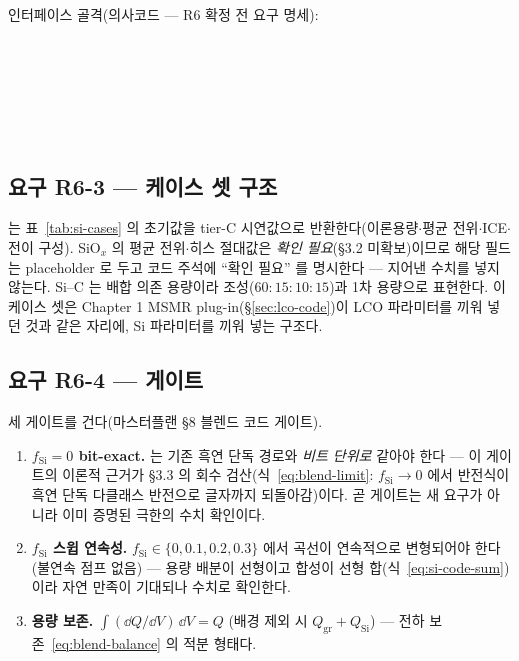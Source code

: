 \begin{codebox}
인터페이스 골격(의사코드 --- R6 확정 전 요구 명세):\\
\\
\\
\\
\\
\\
\\
\end{codebox}

\subsection{요구 R6-3 --- 케이스 셋 구조}\label{ssec:si-code-caseset}
 는 표~\ref{tab:si-cases} 의 초기값을 tier-C 시연값으로 반환한다(이론용량$\cdot$평균
전위$\cdot$ICE$\cdot$전이 구성). SiO$_x$ 의 평균 전위$\cdot$히스 절대값은 \emph{확인 필요}(§3.2 미확보)이므로
해당 필드는 placeholder 로 두고 코드 주석에 ``확인 필요'' 를 명시한다 --- 지어낸 수치를 넣지 않는다.
Si--C 는 배합 의존 용량이라 조성($60{:}15{:}10{:}15$)과 1차 용량으로 표현한다. 이 케이스 셋은 Chapter 1
MSMR plug-in(\S\ref{sec:lco-code})이 LCO 파라미터를 끼워 넣던 것과 같은 자리에, Si 파라미터를 끼워
넣는 구조다.

\subsection{요구 R6-4 --- 게이트}\label{ssec:si-code-gate}
세 게이트를 건다(마스터플랜 §8 블렌드 코드 게이트).
\begin{enumerate}[label=(\arabic*),leftmargin=2.2em,itemsep=1pt]
\item \textbf{$f_\mathrm{Si}=0$ bit-exact.}  는 기존 흑연 단독 경로와
\emph{비트 단위로} 같아야 한다 --- 이 게이트의 이론적 근거가 §3.3 의 회수 검산(식~\eqref{eq:blend-limit}:
$f_\mathrm{Si}\to0$ 에서 반전식이 흑연 단독 다클래스 반전으로 글자까지 되돌아감)이다. 곧 게이트는 새
요구가 아니라 이미 증명된 극한의 수치 확인이다.
\item \textbf{$f_\mathrm{Si}$ 스윕 연속성.} $f_\mathrm{Si}\in\{0,0.1,0.2,0.3\}$ 에서 곡선이 연속적으로
변형되어야 한다(불연속 점프 없음) --- 용량 배분이 선형이고 합성이 선형 합(식~\eqref{eq:si-code-sum})이라
자연 만족이 기대되나 수치로 확인한다.
\item \textbf{용량 보존.} $\int(\dd Q/\dd V)\,\dd V=Q$ (배경 제외 시 $Q_\mathrm{gr}+Q_\mathrm{Si}$) ---
전하 보존~\eqref{eq:blend-balance} 의 적분 형태다.
\end{enumerate}

